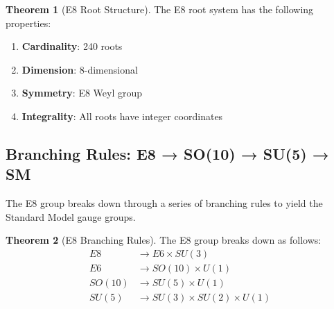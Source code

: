\documentclass[11pt]{article}
\theoremstyle{definition}
\newtheorem{theorem}{Theorem}[section]
\begin{document}
\begin{theorem}[E8 Root Structure]
The E8 root system has the following properties:
\begin{enumerate}
\item \textbf{Cardinality}: 240 roots
\item \textbf{Dimension}: 8-dimensional
\item \textbf{Symmetry}: E8 Weyl group
\item \textbf{Integrality}: All roots have integer coordinates
\end{enumerate}
\end{theorem}

\subsection{Branching Rules: E8 → SO(10) → SU(5) → SM}

The E8 group breaks down through a series of branching rules to yield the Standard Model gauge groups.

\begin{theorem}[E8 Branching Rules]
The E8 group breaks down as follows:
\begin{align}
E8 &\to E6 \times SU(3) \\
E6 &\to SO(10) \times U(1) \\
SO(10) &\to SU(5) \times U(1) \\
SU(5) &\to SU(3) \times SU(2) \times U(1)
\end{align}
\end{theorem}
\end{document}
